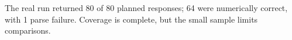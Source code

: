 The real run returned 80 of 80 planned responses; 64 were numerically correct, with 1 parse failure. Coverage is complete, but the small sample limits comparisons.
